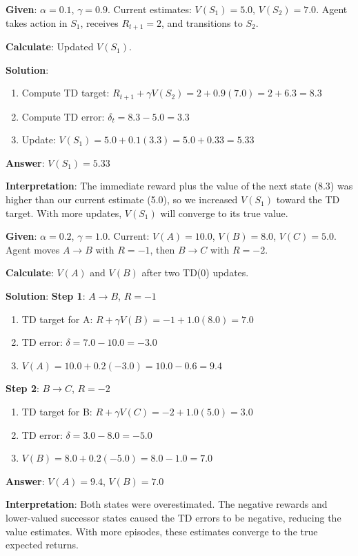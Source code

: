 \documentclass[11pt,a4paper]{article}
\begin{document}
\begin{tcolorbox}[colback=blue!5!white,colframe=blue!75!black,title=\textbf{Worked Example 31: TD(0) Update}]
\textbf{Given}: $\alpha = 0.1$, $\gamma = 0.9$. Current estimates: $V(S_1) = 5.0$, $V(S_2) = 7.0$. Agent takes action in $S_1$, receives $R_{t+1} = 2$, and transitions to $S_2$.

\textbf{Calculate}: Updated $V(S_1)$.

\textbf{Solution}:
\begin{enumerate}
    \item Compute TD target: $R_{t+1} + \gamma V(S_2) = 2 + 0.9(7.0) = 2 + 6.3 = 8.3$
    \item Compute TD error: $\delta_t = 8.3 - 5.0 = 3.3$
    \item Update: $V(S_1) = 5.0 + 0.1(3.3) = 5.0 + 0.33 = 5.33$
\end{enumerate}

\textbf{Answer}: $V(S_1) = 5.33$

\textbf{Interpretation}: The immediate reward plus the value of the next state (8.3) was higher than our current estimate (5.0), so we increased $V(S_1)$ toward the TD target. With more updates, $V(S_1)$ will converge to its true value.
\end{tcolorbox}

\begin{tcolorbox}[colback=green!5!white,colframe=green!75!black,title=\textbf{Worked Example 32: TD(0) Negative Update}]
\textbf{Given}: $\alpha = 0.2$, $\gamma = 1.0$. Current: $V(A) = 10.0$, $V(B) = 8.0$, $V(C) = 5.0$. Agent moves $A \to B$ with $R = -1$, then $B \to C$ with $R = -2$.

\textbf{Calculate}: $V(A)$ and $V(B)$ after two TD(0) updates.

\textbf{Solution}:
\textbf{Step 1}: $A \to B$, $R = -1$
\begin{enumerate}
    \item TD target for A: $R + \gamma V(B) = -1 + 1.0(8.0) = 7.0$
    \item TD error: $\delta = 7.0 - 10.0 = -3.0$
    \item $V(A) = 10.0 + 0.2(-3.0) = 10.0 - 0.6 = 9.4$
\end{enumerate}

\textbf{Step 2}: $B \to C$, $R = -2$
\begin{enumerate}
    \item TD target for B: $R + \gamma V(C) = -2 + 1.0(5.0) = 3.0$
    \item TD error: $\delta = 3.0 - 8.0 = -5.0$
    \item $V(B) = 8.0 + 0.2(-5.0) = 8.0 - 1.0 = 7.0$
\end{enumerate}

\textbf{Answer}: $V(A) = 9.4$, $V(B) = 7.0$

\textbf{Interpretation}: Both states were overestimated. The negative rewards and lower-valued successor states caused the TD errors to be negative, reducing the value estimates. With more episodes, these estimates converge to the true expected returns.
\end{tcolorbox}
\end{document}

